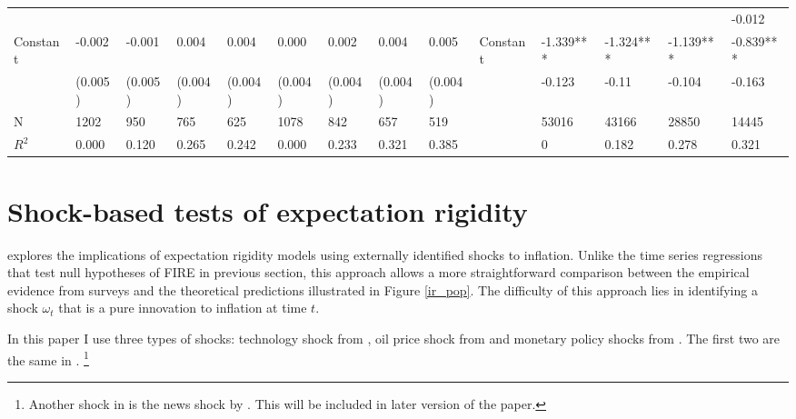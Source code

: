 \documentclass[]{article}
\begin{document}
\begin{table}
\begin{adjustbox}{width={24cm},totalheight={14cm},angle=90}
\begin{tabular}{llllllllllllll}
				&             &           &           &           &               &           &           &           &                      &               &           &           & -0.012    \\
				Constant               & -0.002      & -0.001    & 0.004     & 0.004     & 0.000         & 0.002     & 0.004     & 0.005     &   Constant                   & -1.339***     & -1.324*** & -1.139*** & -0.839*** \\
				& (0.005)     & (0.005)   & (0.004)   & (0.004)   & (0.004)       & (0.004)   & (0.004)   & (0.004)   &                      & -0.123        & -0.11     & -0.104    & -0.163    \\
				\hline 
				N                    & 1202        & 950       & 765       & 625       & 1078          & 842       & 657       & 519       &                      & 53016         & 43166     & 28850     & 14445     \\
				$R^2$ & 0.000       & 0.120     & 0.265     & 0.242     & 0.000         & 0.233     & 0.321     & 0.385     &                      & 0             & 0.182     & 0.278     & 0.321  \\
				\hline    
			\end{tabular}
		\end{adjustbox}
	\end{table}
	
	\section{Shock-based tests of expectation rigidity }\label{IRShocks}
	
	\citet{coibion2012can} explores the implications of expectation rigidity models using externally identified shocks to inflation.  Unlike the time series regressions that test null hypotheses of FIRE in previous section, this approach allows a more straightforward comparison between the empirical evidence from surveys and the theoretical predictions illustrated in Figure \ref{ir_pop}. The difficulty of this approach lies in identifying a shock $\omega_t$ that is a pure innovation to inflation at time $t$. 
	
	In this paper I use three types of shocks: technology shock from \citet{gali1999technology}, oil price shock from \citet{hamilton1996happened} and monetary policy shocks from  \citet{laseen2011anticipated}. The first two are the same in \citet{coibion2012can}. \footnote{ Another shock in \citet{coibon2012can} is the news shock by \citet{barsky2011news}. This will be included in later version of the paper.} 
	
\end{document}
